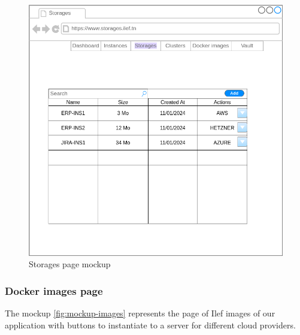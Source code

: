 \begin{figure}[h]
  \center
  \includegraphics[width=13cm]{./chapters/preliminary_study/mockup-storages.png}
  \caption{Storages page mockup}
  \label{fig:mockup-storages}
\end{figure}

\vspace*{3cm}
\subsubsection{Docker images page}


The mockup \hyperref[fig:mockup-images]{\ref{fig:mockup-images}} represents the page of Ilef images of our application with buttons to instantiate to a server for different cloud providers.

